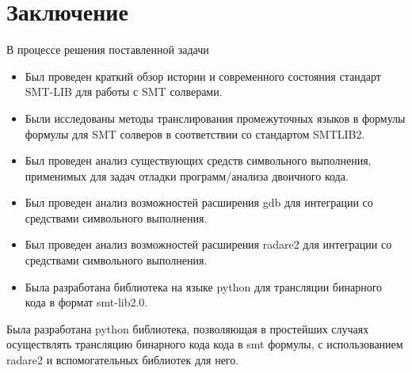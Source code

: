 \bigskip
\section {Заключение} 

В процессе решения поставленной задачи 
\begin{itemize}

\item Был проведен краткий обзор истории и современного состояния стандарт SMT-LIB\cite{smtlib} для работы с SMT солверами.
\item Были исследованы методы транслирования промежуточных языков в формулы  формулы для SMT солверов в соответствии со стандартом SMTLIB2.
\item Был проведен анализ существующих средств символьного выполнения, применимых для задач отладки программ/анализа двоичного кода.
\item Был проведен анализ возможностей расширения gdb для интеграции со средствами символьного выполнения.
\item Был проведен анализ возможностей расширения radare2 для интеграции со средствами символьного выполнения.
\item Была разработана библиотека на языке python для трансляции бинарного кода в формат smt-lib2.0.


\end{itemize}

Была разработана python библиотека,
позволяющая в простейших случаях осуществлять трансляцию бинарного кода кода в smt формулы, с использованием radare2 и вспомогательных библиотек для него.


\bigskip



